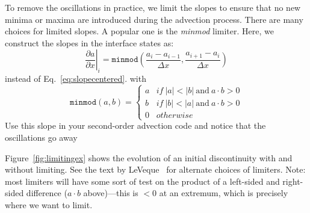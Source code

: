\begin{exercise}
{To remove the oscillations in
practice, we limit the slopes to ensure that no new minima or maxima are
introduced during the advection process.  There are many choices for
limited slopes.  A popular one is the {\em minmod} limiter.  Here, we
construct the slopes in the interface states as:
\begin{equation}
\left . \frac{\partial a}{\partial x} \right |_i = \mathtt{minmod} \left (
  \frac{a_i - a_{i-1}}{\Delta x}, \frac{a_{i+1} - a_i}{\Delta x} \right )
\end{equation}
instead of Eq.~\ref{eq:slopecentered}.
with 
\begin{equation}
\mathtt{minmod}(a,b) = \left \{ 
    \begin{array}{ll}
    a & \mathit{if~} |a| < |b| \mathrm{~and~} a\cdot b > 0 \\
    b & \mathit{if~} |b| < |a| \mathrm{~and~} a\cdot b > 0 \\
    0 & \mathit{otherwise}
    \end{array}
  \right .
\end{equation}
Use this slope in your second-order advection code and notice that the
oscillations go away }
\end{exercise}

Figure~\ref{fig:limitingex} shows the evolution
of an initial discontinuity with and without limiting.  See the text
by LeVeque~\cite{leveque:2002} for alternate choices of
limiters. Note: most limiters will have some sort of test on the product
of a left-sided and right-sided difference ($a\cdot
b$ above)---this is $< 0$ at an extremum, which is precisely where we want to
limit. 

